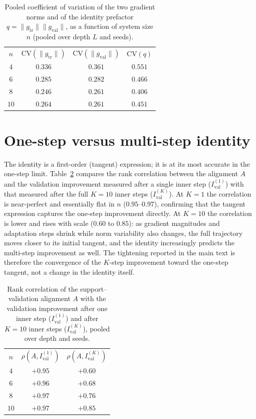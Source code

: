 \documentclass[aps,pra,onecolumn,superscriptaddress,10pt]{revtex4-2}
\newcommand{\CV}{\mathrm{CV}}
\newcommand{\Ival}{I_{\mathrm{val}}}
\newcommand{\gtr}{g_{\mathrm{tr}}}
\newcommand{\gval}{g_{\mathrm{val}}}
\begin{document}
\begin{table}[h]
\caption{\label{tab:cv}%
Pooled coefficient of variation of the two gradient norms and of the identity prefactor
$q=\|\gtr\|\|\gval\|$, as a function of system size $n$ (pooled over depth $L$ and seeds).}
\begin{ruledtabular}
\begin{tabular}{cccc}
$n$ & $\CV(\|\gtr\|)$ & $\CV(\|\gval\|)$ & $\CV(q)$ \\
\colrule
$4$  & $0.336$ & $0.361$ & $0.551$ \\
$6$  & $0.285$ & $0.282$ & $0.466$ \\
$8$  & $0.246$ & $0.261$ & $0.406$ \\
$10$ & $0.264$ & $0.261$ & $0.451$ \\
\end{tabular}
\end{ruledtabular}
\end{table}

\section{One-step versus multi-step identity}
\label{sm:kstep}

The identity is a first-order (tangent) expression; it is at its most accurate in the one-step limit.
Table~\ref{tab:kstep} compares the rank correlation between the alignment $A$ and the validation
improvement measured after a single inner step ($\Ival^{(1)}$) with that measured after the full
$K=10$ inner steps ($\Ival^{(K)}$). At $K=1$ the correlation is near-perfect and essentially flat in
$n$ ($0.95$--$0.97$), confirming that the tangent expression captures the one-step improvement
directly. At $K=10$ the correlation is lower and rises with scale ($0.60$ to $0.85$): as gradient magnitudes and adaptation steps shrink while norm variability also changes, the full trajectory moves closer to its initial tangent, and
the identity increasingly predicts the multi-step improvement as well. The tightening reported in the
main text is therefore the convergence of the $K$-step improvement toward the one-step tangent, not a
change in the identity itself.

\begin{table}[h]
\caption{\label{tab:kstep}%
Rank correlation of the support--validation alignment $A$ with the validation improvement after one
inner step ($\Ival^{(1)}$) and after $K=10$ inner steps ($\Ival^{(K)}$), pooled over depth and seeds.}
\begin{ruledtabular}
\begin{tabular}{ccc}
$n$ & $\rho(A,\Ival^{(1)})$ & $\rho(A,\Ival^{(K)})$ \\
\colrule
$4$  & $+0.95$ & $+0.60$ \\
$6$  & $+0.96$ & $+0.68$ \\
$8$  & $+0.97$ & $+0.76$ \\
$10$ & $+0.97$ & $+0.85$ \\
\end{tabular}
\end{ruledtabular}
\end{table}
\end{document}
